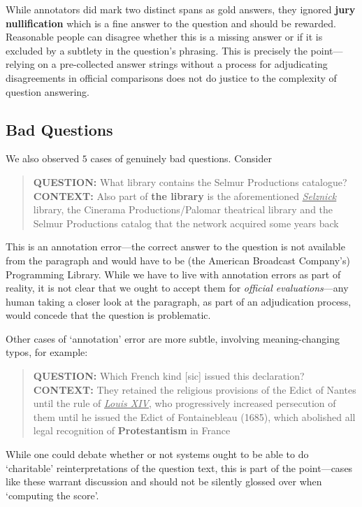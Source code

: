 While annotators did mark two distinct spans as gold answers, they
ignored \textbf{jury nullification} which is a fine answer to the
question and should be rewarded.
Reasonable people can disagree whether this is a missing answer or if
it is excluded by a subtlety in the question's phrasing.
This is precisely the point---relying on a pre-collected answer
strings without a process for adjudicating disagreements in official
comparisons does not do justice to the complexity of question
answering.

\subsection{Bad Questions}

We also observed $5$ cases of genuinely bad questions.  Consider
\begin{quote}
    {\bf QUESTION:}
    What library contains the Selmur Productions catalogue?
 \\
   {\bf CONTEXT:}
    Also part of \textbf{the library} is the aforementioned
    \underline{\textit{Selznick}} library, the Cinerama
    Productions/Palomar theatrical library and the Selmur Productions
    catalog that the network acquired some years back
\end{quote}

This is an annotation error---the correct answer to the question is not available
from the paragraph and would have to be (the American Broadcast Company's) Programming Library.
While we have to live with annotation errors as part of reality, it is not clear that we 
ought to accept them for \emph{official evaluations}---any human taking a closer look
at the paragraph, as part of an adjudication process, would concede that the question is
problematic.

Other cases of `annotation' error are more subtle, involving
meaning-changing typos, for example:

\begin{quote}
    {\bf QUESTION:}
    Which French kind [sic] issued this declaration?
 \\
   {\bf CONTEXT:}
   They retained the religious provisions of the Edict of Nantes until
   the rule of \textit{\uline{Louis XIV}}, who progressively increased
   persecution of them until he issued the Edict of Fontainebleau
   (1685), which abolished all legal recognition of
   \textbf{Protestantism} in France
\end{quote}

While one could debate whether or not systems ought to be able to do
`charitable' reinterpretations of the question text, this is part of
the point---cases like these warrant discussion and should not be
silently glossed over when `computing the score'.
